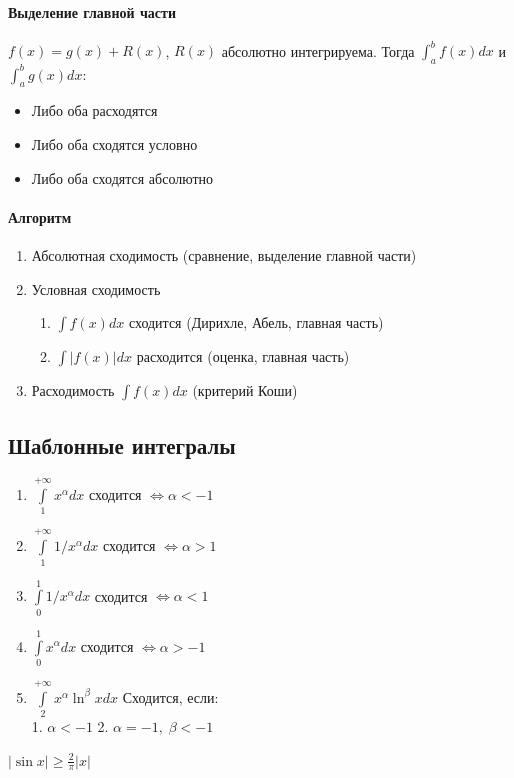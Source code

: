 \documentclass{article}
\begin{document}
\paragraph*{Выделение главной части} $f(x) = g(x) + R(x)$, $R(x)$ абсолютно интегрируема. Тогда $\int_a^b f(x)dx $ и $\int_a^bg(x)dx$:
\begin{itemize}
    \item Либо оба расходятся
    \item Либо оба сходятся условно
    \item Либо оба сходятся абсолютно
\end{itemize}
\paragraph*{Алгоритм}
\begin{enumerate}
    \item Абсолютная сходимость (сравнение, выделение главной части)
    \item Условная сходимость
          \begin{enumerate}
              \item $ \int f(x)dx $ сходится (Дирихле, Абель, главная часть)
              \item $ \int |f(x)|dx $ расходится (оценка, главная часть)
          \end{enumerate}
    \item Расходимость $ \int f(x) dx  $ (критерий Коши)
\end{enumerate}
\subsection{Шаблонные интегралы}
\begin{multicols}{2}
\begin{enumerate}
    \item $\int\limits_1^{+\infty}x^\alpha dx$ сходится $\Leftrightarrow \alpha < -1 $
    \item $\int\limits_1^{+\infty}1/x^\alpha dx$ сходится $\Leftrightarrow \alpha  > 1$
    \item $ \int\limits_0^1 1/x^\alpha dx $ сходится $\Leftrightarrow \alpha  < 1$
    \item $\int\limits_0^1 x^\alpha dx $ сходится $\Leftrightarrow \alpha > -1 $
    \item $\int\limits_2^{+\infty}x^\alpha \ln^\beta x dx$ Сходится, если: \\
    1. $ \alpha < -1 $ 2. $ \alpha = -1,\; \beta < -1 $
\end{enumerate}
\end{multicols}
$|\sin x|\geq \frac{2}{\pi}|x|$
\end{document}
